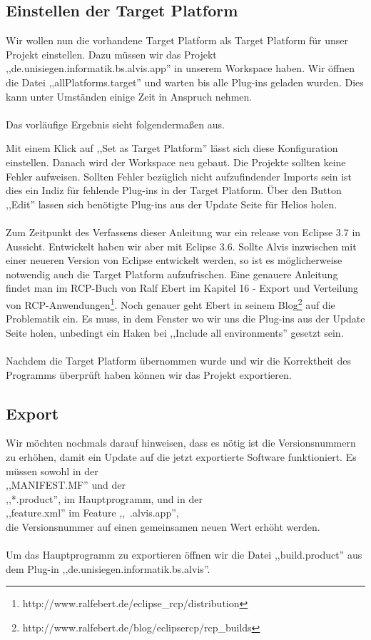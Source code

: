 \documentclass[10pt,a4paper,oneside]{scrbook}
\begin{document}
\subsection{Einstellen der Target Platform}
Wir wollen nun die vorhandene Target Platform als Target Platform für unser Projekt einstellen. Dazu müssen wir das Projekt\\
,,de.unisiegen.informatik.bs.alvis.app'' in unserem Workspace haben. Wir öffnen die Datei ,,allPlatforms.target'' und warten bis alle Plug-ins geladen wurden. Dies kann unter Umständen einige Zeit in Anspruch nehmen. 
\\ \\
Das vorläufige Ergebnis sieht folgendermaßen aus.
\begin{center}
\end{center}

Mit einem Klick auf ,,Set as Target Platform'' lässt sich diese Konfiguration einstellen. 
Danach wird der Workspace neu gebaut. Die Projekte sollten keine Fehler aufweisen. Sollten Fehler bezüglich nicht aufzufindender Imports sein ist dies ein Indiz für fehlende Plug-ins in der Target Platform. Über den Button ,,Edit'' lassen sich benötigte Plug-ins aus der Update Seite für Helios holen.
\\ \\
Zum Zeitpunkt des Verfassens dieser Anleitung war ein release von Eclipse 3.7 in Aussicht. Entwickelt haben wir aber  mit Eclipse 3.6. Sollte Alvis inzwischen mit einer neueren Version von Eclipse entwickelt werden, so ist es möglicherweise notwendig auch die Target Platform aufzufrischen. Eine genauere Anleitung findet man im RCP-Buch von Ralf Ebert im Kapitel 16 - Export und Verteilung von RCP-Anwendungen\footnote{http://www.ralfebert.de/eclipse\_rcp/distribution\/}. Noch genauer geht Ebert in seinem Blog\footnote{http://www.ralfebert.de/blog/eclipsercp/rcp\_builds\/} auf die Problematik ein. Es muss, in dem Fenster wo wir uns die Plug-ins aus der Update Seite holen, unbedingt ein Haken bei ,,Include all environments'' gesetzt sein.
\\ \\

Nachdem die Target Platform übernommen wurde und wir die Korrektheit des Programms überprüft haben können wir das Projekt exportieren. 
\subsection{Export}
Wir möchten nochmals darauf hinweisen, dass es nötig ist die Versionsnummern zu erhöhen, damit ein Update auf die jetzt exportierte Software funktioniert. Es müssen sowohl in der \\
,,MANIFEST.MF'' und der \\
,,*.product'', im Hauptprogramm, und in der \\
,,feature.xml'' im Feature ,,~.alvis.app'', \\
die Versionsnummer auf einen gemeinsamen neuen Wert erhöht werden.
\\ \\
Um das Hauptprogramm zu exportieren öffnen wir die Datei ,,build.product'' aus dem Plug-in ,,de.unisiegen.informatik.bs.alvis''.
\end{document}
